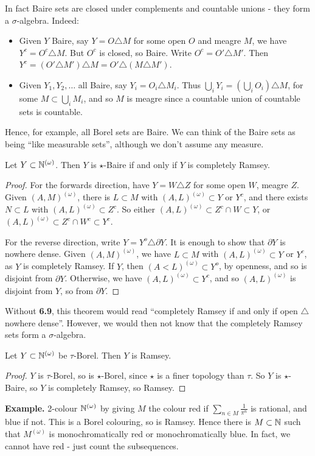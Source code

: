 \documentclass[10pt,a4paper]{article}
\begin{document}
In fact Baire sets are closed under complements and countable unions - they form a $\sigma$-algebra. Indeed:
\begin{itemize}
  \item Given $Y$ Baire, say $Y = O \triangle M$ for some open $O$ and meagre $M$, we have $Y^c = O^c \triangle M$. But $O^c$ is closed, so Baire. Write $O^c = O'\triangle M'$. Then $Y^c = (O' \triangle M') \triangle M = O' \triangle (M \triangle M')$.
  \item Given $Y_1, Y_2, \ldots$ all Baire, say $Y_i = O_i \triangle M_i$. Thus $\bigcup_i Y_i = \left(\bigcup_i O_i\right) \triangle M$, for some $M \subset \bigcup_i M_i$, and so $M$ is meagre since a countable union of countable sets is countable.
\end{itemize}
Hence, for example, all Borel sets are Baire. We can think of the Baire sets as being ``like measurable sets'', although we don't assume any measure.
\begin{theorem}
  Let $Y \subset \mathbb{N}^{(\omega)}$. Then $Y$ is $\star$-Baire if and only if $Y$ is completely Ramsey.
\end{theorem}
\begin{proof}
  For the forwards direction, have $Y = W \triangle Z$ for some open $W$, meagre $Z$. Given $(A,M)^{(\omega)}$, there is $L \subset M$ with $(A,L)^{(\omega)} \subset Y$ or $Y^c$, and there exists $N \subset L$ with $(A,L)^{(\omega)} \subset Z^c$. So either $(A,L)^{(\omega)} \subset Z^c \cap W \subset Y$, or $(A,L)^{(\omega)} \subset Z^c \cap W^c \subset Y^c$.

  For the reverse direction, write $Y = Y^o \triangle \partial Y$. It is enough to show that $\partial Y$ is nowhere dense. Given $(A,M)^{(\omega)}$, we have $L \subset M$ with $(A,L)^{(\omega)} \subset Y$ or $Y^c$, as $Y$ is completely Ramsey. If $Y$, then $(A<L)^{(\omega)} \subset Y^o$, by openness, and so is disjoint from $\partial Y$. Otherwise, we have $(A,L)^{(\omega)} \subset Y^c$, and so $(A,L)^{(\omega)}$ is disjoint from $Y$, so from $\partial Y$.
\end{proof}
Without \textbf{6.9}, this theorem would read ``completely Ramsey if and only if open $\triangle$ nowhere dense''. However, we would then not know that the completely Ramsey sets form a $\sigma$-algebra.
\begin{corollary}
  Let $Y \subset \mathbb{N}^{(\omega)}$ be $\tau$-Borel. Then $Y$ is Ramsey.
\end{corollary}
\begin{proof}
  $Y$ is $\tau$-Borel, so is $\star$-Borel, since $\star$ is a finer topology than $\tau$. So $Y$ is $\star$-Baire, so $Y$ is completely Ramsey, so Ramsey.
\end{proof}
\textbf{Example.} 2-colour $\mathbb{N}^{(\omega)}$ by giving $M$ the colour red if $\sum_{n \in M}\frac{1}{\pi^n}$ is rational, and blue if not. This is a Borel colouring, so is Ramsey. Hence there is $M \subset \mathbb{N}$ such that $M^{(\omega)}$ is monochromatically red or monochromatically blue. In fact, we cannot have red - just count the subsequences.
\end{document}

